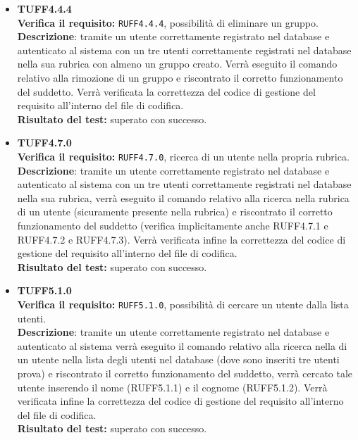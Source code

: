 \begin{itemize}
\item \textbf{TUFF4.4.4}\\
\textbf{Verifica il requisito:} \texttt{RUFF4.4.4}, possibilità di eliminare un gruppo.\\
\textbf{Descrizione}: tramite un utente  correttamente registrato nel database e autenticato al sistema con un tre utenti  correttamente registrati nel database nella sua rubrica con almeno un gruppo creato. Verrà eseguito il comando relativo alla rimozione di un gruppo e riscontrato il corretto funzionamento del suddetto. Verrà verificata la correttezza del codice di gestione del requisito all'interno del file di codifica.\\
\textbf{Risultato del test:} superato con successo.

\item \textbf{TUFF4.7.0}\\ 
\textbf{Verifica il requisito:} \texttt{RUFF4.7.0}, ricerca di un utente nella propria rubrica.\\
\textbf{Descrizione}: tramite un utente  correttamente registrato nel database e autenticato al sistema con un tre utenti  correttamente registrati nel database nella sua rubrica, verrà eseguito il comando relativo alla ricerca nella rubrica di un utente (sicuramente presente nella rubrica) e riscontrato il corretto funzionamento del suddetto (verifica implicitamente anche RUFF4.7.1 e RUFF4.7.2 e RUFF4.7.3). Verrà verificata infine la correttezza del codice di gestione del requisito all'interno del file di codifica.\\
\textbf{Risultato del test:} superato con successo.

\item \textbf{TUFF5.1.0}\\
\textbf{Verifica il requisito:} \texttt{RUFF5.1.0}, possibilità di cercare un utente dalla lista utenti.\\
\textbf{Descrizione}: tramite un utente  correttamente registrato nel database e autenticato al sistema verrà eseguito il comando relativo alla ricerca nella di un utente nella lista degli utenti nel database (dove sono inseriti tre utenti prova) e riscontrato il corretto funzionamento del suddetto, verrà cercato tale utente inserendo il nome (RUFF5.1.1) e il cognome (RUFF5.1.2). Verrà verificata infine la correttezza del codice di gestione del requisito all'interno del file di codifica.\\
\textbf{Risultato del test:} superato con successo.


\end{itemize}
